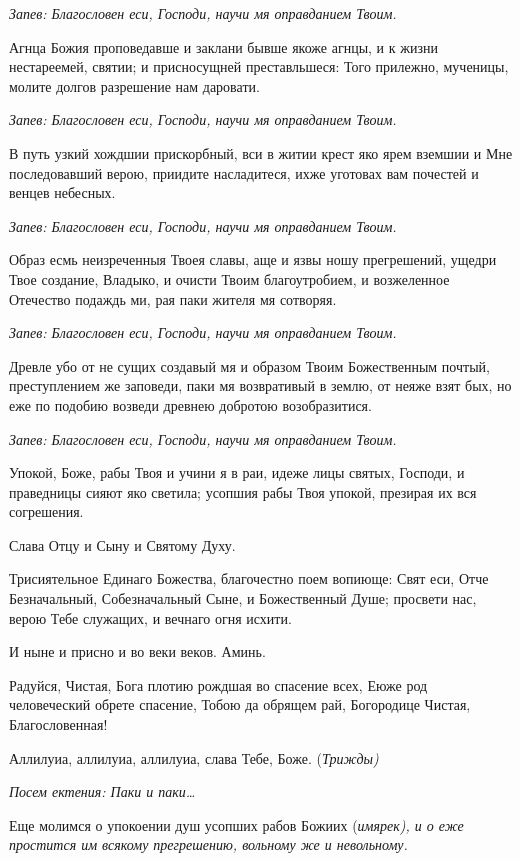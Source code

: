 \itshape Запев:\normalfont{} Благословен еси, Господи, научи мя оправданием Твоим. 

Агнца Божия проповедавше и заклани бывше якоже агнцы, и к жизни нестареемей, святии; и присносущней преставльшеся: Того прилежно, мученицы, молите долгов разрешение нам даровати. 

\itshape Запев:\normalfont{} Благословен еси, Господи, научи мя оправданием Твоим. 

В путь узкий хождшии прискорбный, вси в житии крест яко ярем вземшии и Мне последовавший верою, приидите насладитеся, ихже уготовах вам почестей и венцев небесных. 

\itshape Запев:\normalfont{} Благословен еси, Господи, научи мя оправданием Твоим. 

Образ есмь неизреченныя Твоея славы, аще и язвы ношу прегрешений, ущедри Твое создание, Владыко, и очисти Твоим благоутробием, и возжеленное Отечество подаждь ми, рая паки жителя мя сотворяя. 

\itshape Запев:\normalfont{} Благословен еси, Господи, научи мя оправданием Твоим. 

Древле убо от не сущих создавый мя и образом Твоим Божественным почтый, преступлением же заповеди, паки мя возвративый в землю, от неяже взят бых, но еже по подобию возведи древнею добротою возобразитися. 

\itshape Запев:\normalfont{} Благословен еси, Господи, научи мя оправданием Твоим. 

Упокой, Боже, рабы Твоя и учини я в раи, идеже лицы святых, Господи, и праведницы сияют яко светила; усопшия рабы Твоя упокой, презирая их вся согрешения. 

Слава Отцу и Сыну и Святому Духу. 

Трисиятельное Единаго Божества, благочестно поем вопиюще: Свят еси, Отче Безначальный, Собезначальный Сыне, и Божественный Душе; просвети нас, верою Тебе служащих, и вечнаго огня исхити. 

И ныне и присно и во веки веков. Аминь. 

Радуйся, Чистая, Бога плотию рождшая во спасение всех, Еюже род человеческий обрете спасение, Тобою да обрящем рай, Богородице Чистая, Благословенная! 

Аллилуиа, аллилуиа, аллилуиа, слава Тебе, Боже. (\itshape Трижды\normalfont{}) 

\itshape Посем ектения:\normalfont{} Паки и паки… 

Еще молимся о упокоении душ усопших рабов Божиих (\itshape имярек\normalfont{}), и о еже простится им всякому прегрешению, вольному же и невольному. 

